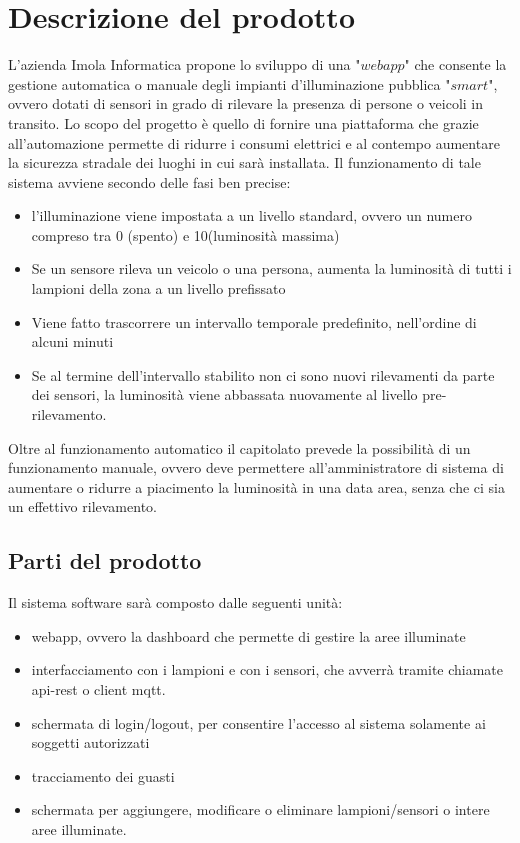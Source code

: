 \documentclass[12pt]{article}
\begin{document}
\section{Descrizione del prodotto}
L'azienda Imola Informatica propone lo sviluppo di una "$webapp$" che consente la gestione automatica o manuale degli impianti d'illuminazione pubblica "$smart$", ovvero dotati di sensori in grado di rilevare la presenza di persone o veicoli in transito.
Lo scopo del progetto è quello di fornire una piattaforma che grazie all'automazione permette di ridurre i consumi elettrici e al contempo aumentare la sicurezza stradale dei luoghi in cui sarà installata.
Il funzionamento di tale sistema avviene secondo delle fasi ben precise:
\begin{itemize}
	\item l'illuminazione viene impostata a un livello standard, ovvero un numero compreso tra 0 (spento) e 10(luminosità massima)
	\item Se un sensore rileva un veicolo o una persona, aumenta la luminosità di tutti i lampioni della zona a un livello prefissato
	\item Viene fatto trascorrere un intervallo temporale predefinito, nell'ordine di alcuni minuti
	\item Se al termine dell'intervallo stabilito non ci sono nuovi rilevamenti da parte dei sensori, la luminosità viene abbassata nuovamente al livello pre-rilevamento.
\end{itemize}
Oltre al funzionamento automatico il capitolato prevede la possibilità di un funzionamento manuale, ovvero deve permettere all'amministratore di sistema di aumentare o ridurre a piacimento la luminosità in una data area, senza che ci sia un effettivo rilevamento.

\subsection{Parti del prodotto}
Il sistema software sarà composto dalle seguenti unità:
\begin{itemize}
	\item webapp, ovvero la dashboard che permette di gestire la aree illuminate
	\item interfacciamento con i lampioni e con i sensori, che avverrà tramite chiamate api-rest o client mqtt.
	\item schermata di login/logout, per consentire l'accesso al sistema solamente ai soggetti autorizzati
	\item tracciamento dei guasti
	\item schermata per aggiungere, modificare o eliminare lampioni/sensori o intere aree illuminate.
\end{itemize}
\end{document}
